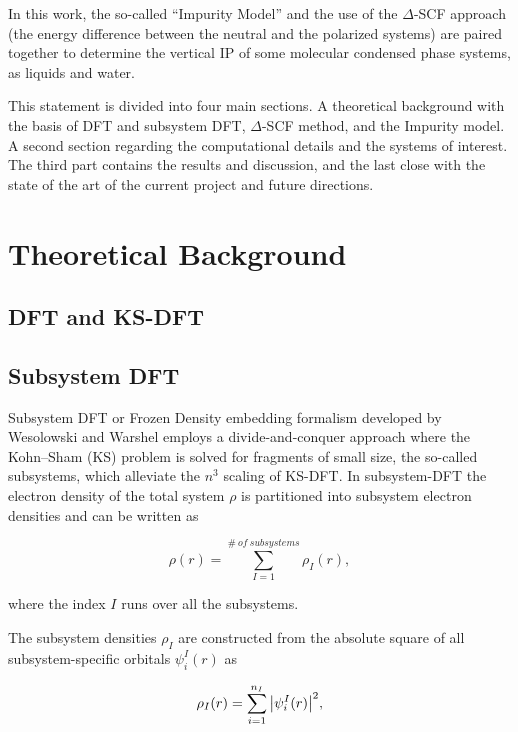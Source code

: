 \documentclass[notitlepage,12pt]{report}
\begin{document}
	In this work, the so-called “Impurity Model” and the use of the $\Delta$-SCF approach (the energy difference between the neutral and the polarized systems) are paired together to determine the vertical IP of some molecular condensed phase systems, as liquids and water. 
	
	This statement is divided into four main sections. A theoretical background with the basis of DFT and subsystem DFT, $\Delta$-SCF method, and the Impurity model. A second section regarding the computational details and the systems of interest. The third part contains the results and discussion, and the last close with the state of the art of the current project and future directions. 


\section{Theoretical Background}

	\subsection{DFT and KS-DFT}

	\supercite{ullrich2012time}
	\supercite{parr1980density}	
	\supercite{wesolowski2007hohenberg}

	\subsection{Subsystem DFT}
	Subsystem DFT or Frozen Density embedding formalism developed by Wesolowski and Warshel employs a divide-and-conquer approach where the Kohn--Sham (KS) problem is solved for fragments of small size, the so-called subsystems, which alleviate the $n^3$ scaling of KS-DFT\supercite{sDFT,wesolowski1993frozen,wesolowski2006one}. In subsystem-DFT the electron density of the total system $\rho$ is partitioned into subsystem electron densities and can be written as

	\begin{equation}\label{eq:sumdensity}
		\rho(r) = \sum\limits_{I=1}^{ \# \ of \ subsystems} \rho_{I}(r),
	\end{equation}

	where the index $I$ runs over all the subsystems.
	
	The subsystem densities $\rho_I$ are constructed from the absolute square of all subsystem-specific orbitals $\psi_{i}^I(r)$ as

	\begin{equation}\label{eq:subso}
		\rho_I( r) = \sum\limits_{i=1}^{n_I} \abs{\psi_{i}^I(r)}^2,
	\end{equation}
	
\end{document}
